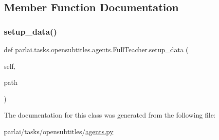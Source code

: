 \subsection{Member Function Documentation}
\mbox{\label{classparlai_1_1tasks_1_1opensubtitles_1_1agents_1_1FullTeacher_abd9f716304f56c2b8b7f7573d34c87f6}} 
\subsubsection{\texorpdfstring{setup\+\_\+data()}{setup\_data()}}
{\footnotesize\ttfamily def parlai.\+tasks.\+opensubtitles.\+agents.\+Full\+Teacher.\+setup\+\_\+data (\begin{DoxyParamCaption}\item[{}]{self,  }\item[{}]{path }\end{DoxyParamCaption})}



The documentation for this class was generated from the following file\+:\begin{DoxyCompactItemize}
\item 
parlai/tasks/opensubtitles/\hyperlink{parlai_2tasks_2opensubtitles_2agents_8py}{agents.\+py}\end{DoxyCompactItemize}

